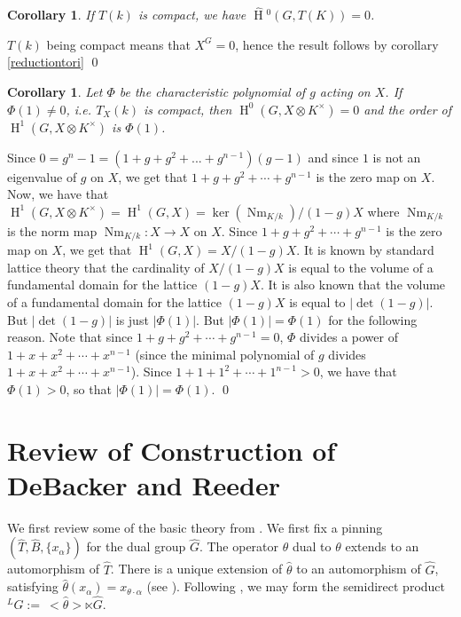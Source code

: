 \documentclass[11pt]{amsart}
\theoremstyle{plain}
\newtheorem{corollary}[theorem]{Corollary}
\newcommand{\HT}[1]{\hat{\HH}{}^{#1}}
\theoremstyle{definition}
\DeclareMathOperator{\HH}{H}
\DeclareMathOperator{\Nm}{Nm}
\begin{document}
\begin{corollary}
If $T(k)$ is compact, we have $\HT{0}(G, T(K)) = 0$.
\end{corollary}

\proof
$T(k)$ being compact means that $X^G = 0$, hence the result follows by corollary \ref{reductiontori}
\qed

\begin{corollary}
  Let $\Phi$ be the characteristic polynomial of $g$ acting on $X$. If
  $\Phi(1)\neq 0$, i.e. $T_X(k)$ is compact, then $\HH^0(G, X\otimes
  K^{\times})=0$ and the order of $\HH^1(G, X\otimes K^{\times})$ is
  $\Phi(1)$.
\end{corollary}

\proof

Since $0 = g^n - 1 = (1 + g + g^2 + ... + g^{n-1})(g-1)$ and since $1$
is not an eigenvalue of $g$ on $X$, we get that $1 + g + g^2 + \cdots + g^{n-1}$
is the zero map on $X$.  Now, we have that
$\HH^1(G, X\otimes K^{\times}) = \HH^1(G, X) = \ker(\Nm_{K/k}) / (1 - g)X$
where $\Nm_{K/k}$ is the norm map $\Nm_{K/k} : X \rightarrow X$ on $X$.
Since $1 + g + g^2 + \cdots + g^{n-1}$ is the zero map on $X$,
we get that $\HH^1(G, X) = X / (1 - g)X$.  It is known by standard lattice
theory that the cardinality of $X / (1 - g)X$ is equal to the volume of
a fundamental domain for the lattice $(1 - g)X$.  It is also known that
the volume of a fundamental domain for the lattice $(1 - g)X$ is equal to
$|\det(1 - g)|$.  But $|\det(1 - g)|$ is just $|\Phi(1)|$.  But
$|\Phi(1)| = \Phi(1)$ for the following reason.  Note that since
$1 + g + g^2 + \cdots + g^{n-1} = 0$, $\Phi$ divides a power of
$1 + x + x^2 + \cdots + x^{n-1}$ (since the minimal polynomial of $g$
divides $1 + x + x^2 + \cdots + x^{n-1}$).  Since
$1 + 1 + 1^2 + \cdots + 1^{n-1} > 0$, we have that $\Phi(1) > 0$,
so that $|\Phi(1)| = \Phi(1)$.
\qed

\section{Review of Construction of DeBacker and Reeder}\label{preliminaries}

We first review some of the basic theory from \cite{debackerreeder}.
We first fix a pinning $(\hat{T}, \hat{B}, \{x_{\alpha} \})$ for the
dual group $\hat{G}$.  The operator $\hat{\theta}$ dual to $\theta$
extends to an automorphism of $\hat{T}$.  There is a unique extension
of $\hat{\theta}$ to an automorphism of $\hat{G}$, satisfying
$\hat{\theta}(x_{\alpha}) = x_{\theta \cdot \alpha}$ (see
\cite[section 3.2]{debackerreeder}).  Following \cite{debackerreeder},
we may form the semidirect product ${}^L G := \ <\hat{\theta}> \ltimes \hat{G}$.
\end{document}
